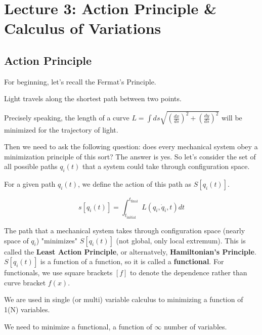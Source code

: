 \section{Lecture 3: Action Principle \& Calculus of Variations}

\subsection{Action Principle}

For beginning, let's recall the Fermat's Principle.

\begin{definition}
    Light travels along the shortest path between two points.
\end{definition}

Precisely speaking, the length of a curve $L = \int ds \sqrt{\left(\frac{dx}{ds}\right)^2 + \left(\frac{dy}{ds}\right)^2}$
will be minimized for the trajectory of light.

Then we need to ask the following question: does every mechanical system obey a 
minimization principle of this sort? The answer is yes. So let's consider the set of all
possible paths $q_i\left(t\right)$ that a system could take through configuration space.

For a given path $q_i\left(t\right)$, we define the action of this path as
$S[q_i\left(t\right)]$.

\[
    s[q_i\left(t\right)] = \int_{t_\text{initial}}^{t_\text{final}} L\left(q_i, \dot{q}_i, t\right) dt
\]

The path that a mechanical system takes through configuration space (nearly space of $q_i$)
"minimizes" $S[q_i\left(t\right)]$ (not global, only local extremum). This is called the
\textbf{Least Action Principle}, or alternatvely, \textbf{Hamiltonian's Principle}. 
$S[q_i\left(t\right)]$ is a function of a function, so it is called a \textbf{functional}.
For functionals, we use square brackets $[f]$ to denote the dependence rather than curve bracket
$f\left(x\right)$.

We are used in single (or multi) variable calculus to minimizing a function of 1(N) variables.

We need to minimize a functional, a function of $\infty$ number of variables. 